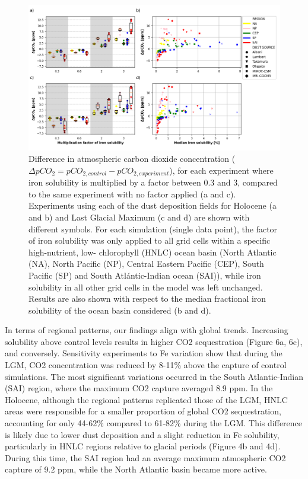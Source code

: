 \begin{figure}[h!]
    \includegraphics[scale=0.65]{../../Data_function/Function/PicturePaper/Figure4_Final.png}
    \caption{Difference in atmospheric carbon dioxide concentration ($\Delta pCO_2 = pCO_{2,control} - pCO_{2,experiment}$), for each experiment where iron solubility is multiplied by a factor between 0.3 and 3, compared to the same experiment with no factor applied (a and c). Experiments using each of the dust deposition fields for Holocene (a and b) and Last Glacial Maximum (c and d) are shown with different symbols. For each simulation (single data point), the factor of iron solubility was only applied to all grid cells within a specific high-nutrient, low- chlorophyll (HNLC) ocean basin (North Atlantic (NA), North Pacific (NP), Central Eastern Pacific (CEP), South Pacific (SP) and South Atlántic-Indian ocean (SAI)), while iron solubility in all other grid cells in the model was left unchanged. Results are also shown with respect to the median fractional iron solubility of the ocean basin considered (b and d). }
\end{figure}

In terms of regional patterns, our findings align with global trends. Increasing solubility above control levels results in higher CO2 sequestration (Figure 6a, 6c), and conversely. Sensitivity experiments to Fe variation show that during the LGM, CO2 concentration was reduced by 8-11\% above the capture of control simulations. The most significant variations occurred in the South Atlantic-Indian (SAI) region, where the maximum CO2 capture averaged 8.9 ppm. In the Holocene, although the regional patterns replicated those of the LGM, HNLC areas were responsible for a smaller proportion of global CO2 sequestration, accounting for only 44-62\% compared to 61-82\% during the LGM. This difference is likely due to lower dust deposition and a slight reduction in Fe solubility, particularly in HNLC regions relative to glacial periods (Figure 4b and 4d). During this time, the SAI region had an average maximum atmospheric CO2 capture of 9.2 ppm, while the North Atlantic basin became more active. 

